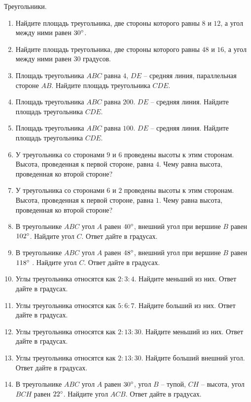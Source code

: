 \documentclass[12pt, a4paper]{article}
\begin{document}
	
	Треугольники.
	\begin{enumerate}
		\item Найдите площадь треугольника, две стороны которого равны \( 8 \) и \( 12 \), а угол между ними равен \( 30\degree \).
		\item Найдите площадь треугольника, две стороны которого равны \( 48  \) и \( 16 \), а угол между ними равен \( 30  \) градусов.
		\item Площадь треугольника \( ABC \) равна \( 4 \), \( DE\) – средняя линия, параллельная стороне \( AB \). Найдите площадь треугольника \( CDE \).
		\item Площадь треугольника \( ABC  \) равна \( 200 \). \( DE \) – средняя линия. Найдите площадь треугольника \( CDE \).
		\item Площадь треугольника \( ABC  \) равна \( 100 \). \( DE \) – средняя линия. Найдите площадь треугольника \( CDE \).
		\item У треугольника со сторонами \( 9 \) и \( 6  \) проведены высоты к этим сторонам. Высота, проведенная к первой стороне, равна \( 4 \). Чему равна высота, проведенная ко второй стороне?
		\item У треугольника со сторонами \( 6 \) и \( 2 \) проведены высоты к этим сторонам. Высота, проведенная к первой стороне, равна \( 1 \). Чему равна высота, проведенная ко второй стороне?
		\item В треугольнике \( ABC \) угол \( A \) равен \( 40 \degree\), внешний угол при вершине \( B \) равен \( 102 \degree\). Найдите угол \( C \). Ответ дайте в градусах.
		\item В треугольнике \( ABC  \) угол \( A \) равен \( 48 \degree\), внешний угол при вершине \( B \) равен \( 118 \degree\) . Найдите угол \( C \). Ответ дайте в градусах.
		\item Углы треугольника относятся как \(2:3:4\). Найдите меньший из них. Ответ дайте в градусах.
		\item Углы треугольника относятся как \(5:6:7\). Найдите больший из них. Ответ дайте в градусах.
		\item Углы треугольника относятся как \(2:13:30\). Найдите меньший из них. Ответ дайте в градусах.
		\item Углы треугольника относятся как \(2:13:30\). Найдите больший внешний угол. Ответ дайте в градусах.
		\item В треугольнике \( ABC \) угол \( A \) равен \( 30\degree\), угол \( B \) – тупой, \(CH\) – высота, угол \( BCH \) равен \( 22 \degree \). Найдите угол \( ACB \). Ответ дайте в градусах.

\end{enumerate}
\end{document}
